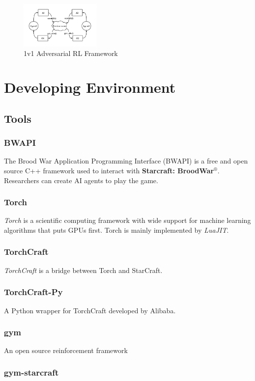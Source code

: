 \documentclass[sigconf]{acmart}
\begin{document}
\begin{figure}[htb]
\centering
\caption{1v1 Adversarial RL Framework}
\includegraphics[width=0.35\textwidth]{./img/Adversarial_Reinforcement_Learning.pdf}
\end{figure}

\section{Developing Environment}
\subsection{Tools}
\subsubsection{BWAPI}
The Brood War Application Programming Interface (BWAPI) is a free and open source C++ framework used to interact with \textbf{Starcraft: BroodWar$^\circledR$}. Researchers can create AI agents to play the game.\cite{GitHub:bwapi}
\subsubsection{Torch}
\emph{Torch} is a scientific computing framework with wide support for machine learning algorithms that puts GPUs first.
Torch is mainly implemented by \emph{LuaJIT}.\cite{GitHub:torch}
\subsubsection{TorchCraft}
\emph{TorchCraft} is a bridge between Torch and StarCraft.\cite{GitHub:TorchCraft,DBLP:journals/corr/SynnaeveNACLLRU16}
\subsubsection{TorchCraft-Py}
A Python wrapper for TorchCraft developed by Alibaba.\cite{GitHub:torchcraft-py}
\subsubsection{gym}
An open source reinforcement framework
\subsubsection{gym-starcraft}
\end{document}
